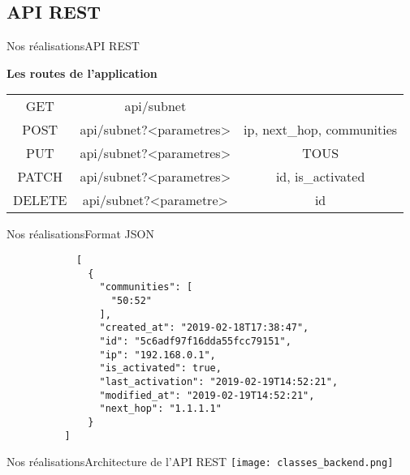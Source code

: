 \subsection{API REST}

\begin{frame}{Nos réalisations}{API REST}

\textbf{Les routes de l'application}

\begin{table}
    \begin{tabulary}{\textwidth}{|C C C|}
        \hline
        \color{background}{Méthode HTTP} & \color{background}{URI} & \color{background}{Paramètres}\\
        \hline
	    GET & api/subnet & \\
	    POST & api/subnet?<parametres> & ip, next\_hop, communities \\
	    PUT & api/subnet?<parametres> & TOUS \\
	    PATCH & api/subnet?<parametres> & id, is\_activated \\
	    DELETE & api/subnet?<parametre> & id \\
	    \hline
	\end{tabulary}
\end{table}

\end{frame}

\begin{frame}[fragile]{Nos réalisations}{Format JSON}
    \begin{minipage}{0.3\textwidth}
        \begin{verbatim}
            [
              {
                "communities": [
                  "50:52"
                ], 
                "created_at": "2019-02-18T17:38:47", 
                "id": "5c6adf97f16dda55fcc79151", 
                "ip": "192.168.0.1", 
                "is_activated": true, 
                "last_activation": "2019-02-19T14:52:21", 
                "modified_at": "2019-02-19T14:52:21", 
                "next_hop": "1.1.1.1"
              }
          ]
        \end{verbatim}
    \end{minipage}
\end{frame}

\begin{frame}{Nos réalisations}{Architecture de l'API REST}
    \texttt{[image: classes\_backend.png]}
\end{frame}